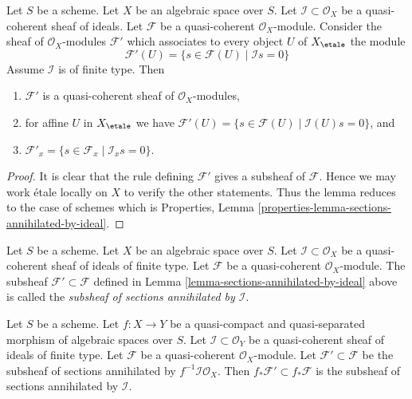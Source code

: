 \begin{lemma}
\label{lemma-sections-annihilated-by-ideal}
Let $S$ be a scheme. Let $X$ be an algebraic space over $S$.
Let $\mathcal{I} \subset \mathcal{O}_X$ be a quasi-coherent sheaf of ideals.
Let $\mathcal{F}$ be a quasi-coherent $\mathcal{O}_X$-module.
Consider the sheaf of $\mathcal{O}_X$-modules $\mathcal{F}'$
which associates to every object $U$ of $X_\etale$ the module
$$
\mathcal{F}'(U)
=
\{s \in \mathcal{F}(U) \mid
\mathcal{I}s = 0\}
$$
Assume $\mathcal{I}$ is of finite type. Then
\begin{enumerate}
\item $\mathcal{F}'$ is a quasi-coherent sheaf of $\mathcal{O}_X$-modules,
\item for affine $U$ in $X_\etale$ we have
$\mathcal{F}'(U) = \{s \in \mathcal{F}(U) \mid \mathcal{I}(U)s = 0\}$, and
\item $\mathcal{F}'_x = \{s \in \mathcal{F}_x \mid \mathcal{I}_x s = 0\}$.
\end{enumerate}
\end{lemma}

\begin{proof}
It is clear that the rule defining $\mathcal{F}'$ gives a subsheaf
of $\mathcal{F}$. Hence we may work \'etale locally on $X$ to verify
the other statements. Thus the lemma reduces to the case of schemes
which is
Properties, Lemma \ref{properties-lemma-sections-annihilated-by-ideal}.
\end{proof}

\begin{definition}
\label{definition-subsheaf-sections-annihilated-by-ideal}
Let $S$ be a scheme. Let $X$ be an algebraic space over $S$.
Let $\mathcal{I} \subset \mathcal{O}_X$ be a quasi-coherent
sheaf of ideals of finite type.
Let $\mathcal{F}$ be a quasi-coherent $\mathcal{O}_X$-module.
The subsheaf $\mathcal{F}' \subset \mathcal{F}$ defined in
Lemma \ref{lemma-sections-annihilated-by-ideal} above is called
the {\it subsheaf of sections annihilated by $\mathcal{I}$}.
\end{definition}

\begin{lemma}
\label{lemma-push-sections-annihilated-by-ideal}
Let $S$ be a scheme.
Let $f : X \to Y$ be a quasi-compact and quasi-separated morphism
of algebraic spaces over $S$.
Let $\mathcal{I} \subset \mathcal{O}_Y$ be a quasi-coherent
sheaf of ideals of finite type. Let $\mathcal{F}$ be a quasi-coherent
$\mathcal{O}_X$-module. Let $\mathcal{F}' \subset \mathcal{F}$
be the subsheaf of sections annihilated by $f^{-1}\mathcal{I}\mathcal{O}_X$.
Then $f_*\mathcal{F}' \subset f_*\mathcal{F}$ is the subsheaf
of sections annihilated by $\mathcal{I}$.
\end{lemma}

